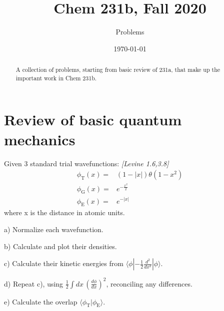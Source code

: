 

\def\ba{{\bf a}}
\def\bb{{\bf b}}
\def\bc{{\bf c}}
\def\bp{{\bf p}}
\def\br{{\bf r}}
\def\bu{{\bf u}}
\def\bv{{\bf v}}
\def\bx{{\bf x}}
\def\bA{{\bf A}}
\def\bB{{\bf B}}
\def\bC{{\bf C}}
\def\bE{{\bf E}}
\def\cE{{\cal E}}
\def\bF{{\bf F}}
\def\bN{{\bf N}}
\def\bR{{\bf R}}
\def\bL{{\bf L}}
\def\bP{{\bf P}}
\def\ext{^{\rm ext}}
\def\sol#1{{\em\tiny #1}}
\def\sol#1{}

\usepackage{subcaption}
\graphicspath{ {./images/} }
\newcommand{\be}{\begin{equation*}}
\newcommand{\ee}{\end{equation*}}
\newcommand{\thus}{\quad\rightarrow\quad}


\sf

\title{Chem 231b, Fall 2020}
\author{Problems}
\date{\today}
\begin{abstract}
A collection of problems, starting from basic review of 231a,
that make up the important work in Chem 231b.
\end{abstract}
\maketitle
\tableofcontents

\newpage
\part{Review of basic quantum mechanics}
\newpage
{}

Given 3 standard trial wavefunctions:
{\em [Levine 1.6,3.8]}
\begin{align}
   \phi_{\text{T}}(x) = & (1 - |x|) \theta(1-x^2) \\
   \phi_{\text{G}}(x) = & e^{-\frac{x^2}{2}} \\
   \phi_{\text{E}}(x) = & e^{-|x|}
\end{align}
where x is the distance in atomic units.

a) Normalize each wavefunction.

b) Calculate and plot their densities.

c) Calculate their kinetic energies from $\langle\phi|-\frac{1}{2}\frac{d^2}{dx^2}|\phi\rangle$.

d) Repeat c), using $\frac{1}{2}\int dx\, (\frac{d\phi}{dx})^2$, reconciling
any differences.

e) Calculate the overlap $\langle\phi_{\text{T}}|\phi_{\text{E}}\rangle$.

